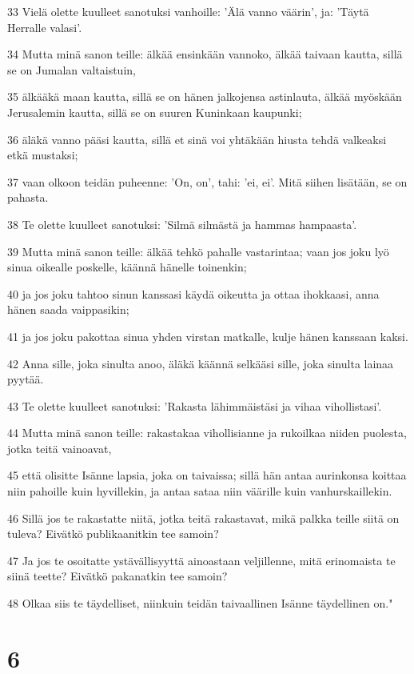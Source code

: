 \par 33 Vielä olette kuulleet sanotuksi vanhoille: 'Älä vanno väärin', ja: 'Täytä Herralle valasi'.
\par 34 Mutta minä sanon teille: älkää ensinkään vannoko, älkää taivaan kautta, sillä se on Jumalan valtaistuin,
\par 35 älkääkä maan kautta, sillä se on hänen jalkojensa astinlauta, älkää myöskään Jerusalemin kautta, sillä se on suuren Kuninkaan kaupunki;
\par 36 äläkä vanno pääsi kautta, sillä et sinä voi yhtäkään hiusta tehdä valkeaksi etkä mustaksi;
\par 37 vaan olkoon teidän puheenne: 'On, on', tahi: 'ei, ei'. Mitä siihen lisätään, se on pahasta.
\par 38 Te olette kuulleet sanotuksi: 'Silmä silmästä ja hammas hampaasta'.
\par 39 Mutta minä sanon teille: älkää tehkö pahalle vastarintaa; vaan jos joku lyö sinua oikealle poskelle, käännä hänelle toinenkin;
\par 40 ja jos joku tahtoo sinun kanssasi käydä oikeutta ja ottaa ihokkaasi, anna hänen saada vaippasikin;
\par 41 ja jos joku pakottaa sinua yhden virstan matkalle, kulje hänen kanssaan kaksi.
\par 42 Anna sille, joka sinulta anoo, äläkä käännä selkääsi sille, joka sinulta lainaa pyytää.
\par 43 Te olette kuulleet sanotuksi: 'Rakasta lähimmäistäsi ja vihaa vihollistasi'.
\par 44 Mutta minä sanon teille: rakastakaa vihollisianne ja rukoilkaa niiden puolesta, jotka teitä vainoavat,
\par 45 että olisitte Isänne lapsia, joka on taivaissa; sillä hän antaa aurinkonsa koittaa niin pahoille kuin hyvillekin, ja antaa sataa niin väärille kuin vanhurskaillekin.
\par 46 Sillä jos te rakastatte niitä, jotka teitä rakastavat, mikä palkka teille siitä on tuleva? Eivätkö publikaanitkin tee samoin?
\par 47 Ja jos te osoitatte ystävällisyyttä ainoastaan veljillenne, mitä erinomaista te siinä teette? Eivätkö pakanatkin tee samoin?
\par 48 Olkaa siis te täydelliset, niinkuin teidän taivaallinen Isänne täydellinen on."

\chapter{6}

